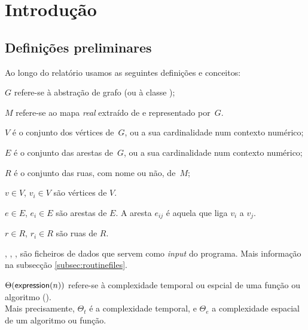 \documentclass[relatorio.tex]{subfiles}
\begin{document}
\section{Introdução}
\label{sec:intro}

\subsection{Definições preliminares}
\label{subsec:preliminaries}

Ao longo do relatório usamos as seguintes definições e conceitos:

\begin{definitions}
\item $G$ refere-se à abstração de grafo (ou à classe );

\item $M$ refere-se ao mapa \textsl{real} extraído de \osm{} e
representado por~$G$.

\item $V$ é o conjunto dos vértices de~$G$, ou a
sua cardinalidade num contexto numérico;

\item $E$ é o conjunto das arestas de~$G$, ou a sua
cardinalidade num contexto numérico;

\item $R$ é o conjunto das ruas, com nome ou não, de~$M$;

\item $v\in V$, $v_i\in V$ são vértices de $V$.

\item $e\in E$, $e_i\in E$ são arestas de $E$.
A aresta $e_{ij}$ é aquela que liga $v_i$ a $v_j$.

\item $r\in R$, $r_i\in R$ são ruas de $R$.

\item {}, , , 
são ficheiros de dados que servem como \textsl{input} do programa.
Mais informação na subsecção \ref{subsec:routinefiles}.

\item $\Theta(\sfmath{expression}(n))$ refere-se à complexidade
temporal ou espcial de uma função ou algoritmo (\bigO).\\
Mais precisamente, $\Theta_t$ é a complexidade temporal,
e $\Theta_e$ a complexidade espacial de um algoritmo ou função.
\end{definitions}
\end{document}
